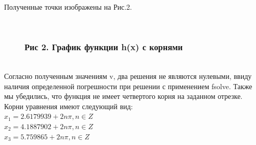 \documentclass[russian,utf8,nocolumnxxxi,nocolumnxxxii]{eskdtext}
\begin{document}
Полученные точки изображены на Рис.2.
\begin{figure}[H]
\begin{center}
\begin{minipage}[h]{0.65\linewidth}
  \\
\frametitle{Рис 2. График функции h(x) с корнями}
\end{minipage}
\end{center}
\end{figure}
\\
Согласно полученным значениям v, два решения не являются нулевыми, ввиду наличия определенной погрешности при решении с применением  fsolve. Также мы убедились, что функция не имеет четвертого корня на заданном отрезке.\\

Корни уравнения имеют следующий вид:\\
$x_1=2.6179939+2n\pi,n\in Z$\\
$x_2=4.1887902+2n\pi,n\in Z$\\
$x_3=5.759865+2n\pi,n\in Z$\\
\end{document}
